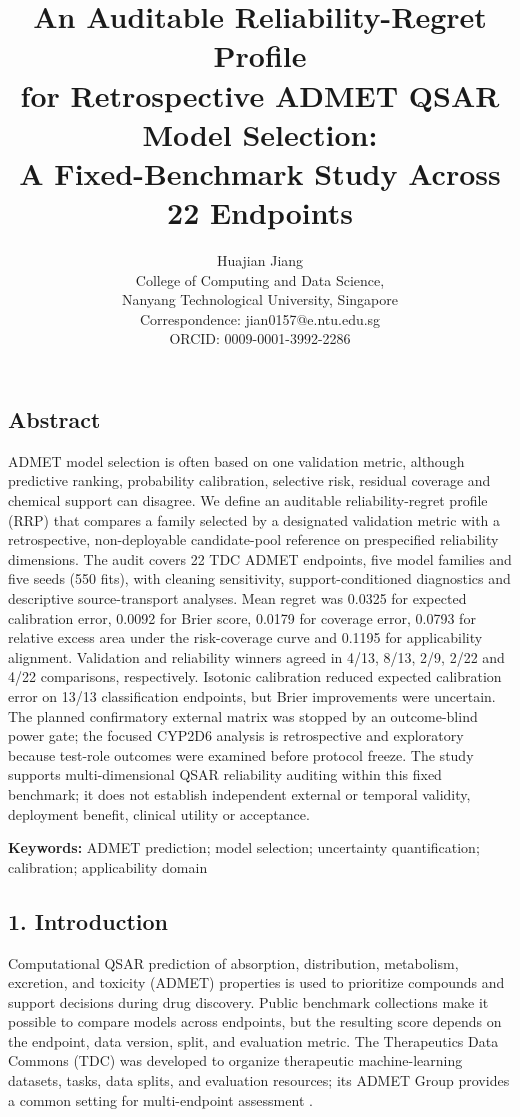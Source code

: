 \documentclass[
]{article}
\title{An Auditable Reliability-Regret Profile\\
for Retrospective ADMET QSAR Model Selection:\\
A Fixed-Benchmark Study Across 22 Endpoints}
\author{Huajian Jiang\\
College of Computing and Data Science,\\
Nanyang Technological University, Singapore\\
Correspondence: jian0157@e.ntu.edu.sg\\
ORCID: 0009-0001-3992-2286}
\date{}
\begin{document}
\maketitle

\subsection{Abstract}\label{abstract}

ADMET model selection is often based on one validation metric, although
predictive ranking, probability calibration, selective risk, residual
coverage and chemical support can disagree. We define an auditable
reliability-regret profile (RRP) that compares a family selected by a
designated validation metric with a retrospective, non-deployable
candidate-pool reference on prespecified reliability dimensions. The audit
covers 22 TDC ADMET endpoints, five model families and five seeds (550 fits),
with cleaning sensitivity, support-conditioned diagnostics and descriptive
source-transport analyses. Mean regret was 0.0325 for expected calibration
error, 0.0092 for Brier score, 0.0179 for coverage error, 0.0793 for relative
excess area under the risk-coverage curve and 0.1195 for applicability
alignment. Validation and reliability winners agreed in 4/13, 8/13, 2/9,
2/22 and 4/22 comparisons, respectively. Isotonic calibration reduced
expected calibration error on 13/13 classification endpoints, but Brier
improvements were uncertain. The planned confirmatory external matrix was
stopped by an outcome-blind power gate; the focused CYP2D6 analysis is
retrospective and exploratory because test-role outcomes were examined before
protocol freeze. The study supports multi-dimensional QSAR reliability
auditing within this fixed benchmark; it does not establish independent
external or temporal validity, deployment benefit, clinical utility or
acceptance.

\textbf{Keywords:} ADMET prediction; model selection; uncertainty
quantification; calibration; applicability domain

\subsection{1. Introduction}\label{introduction}

Computational QSAR prediction of absorption, distribution, metabolism,
excretion, and toxicity (ADMET) properties is used to prioritize
compounds and support decisions during drug discovery. Public benchmark
collections make it possible to compare models across endpoints, but the
resulting score depends on the endpoint, data version, split, and
evaluation metric. The Therapeutics Data Commons (TDC) was developed to
organize therapeutic machine-learning datasets, tasks, data splits, and
evaluation resources; its ADMET Group provides a common setting for
multi-endpoint assessment \cite{huang2021tdc}.
\end{document}
